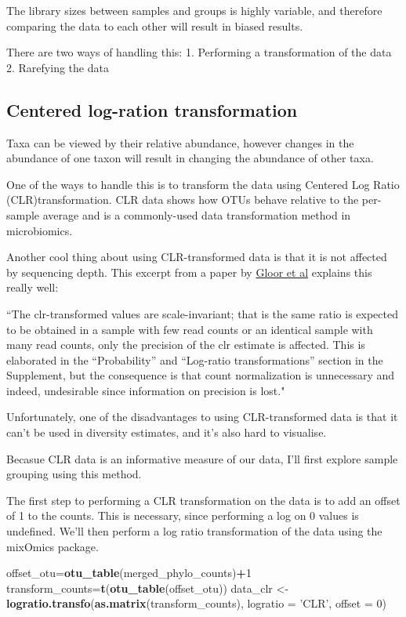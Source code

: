 \documentclass[]{article}
\newenvironment{Shaded}{\begin{snugshade}}{\end{snugshade}}
\newcommand{\DataTypeTok}[1]{\textcolor[rgb]{0.13,0.29,0.53}{#1}}
\newcommand{\DecValTok}[1]{\textcolor[rgb]{0.00,0.00,0.81}{#1}}
\newcommand{\KeywordTok}[1]{\textcolor[rgb]{0.13,0.29,0.53}{\textbf{#1}}}
\newcommand{\NormalTok}[1]{#1}
\newcommand{\OperatorTok}[1]{\textcolor[rgb]{0.81,0.36,0.00}{\textbf{#1}}}
\newcommand{\StringTok}[1]{\textcolor[rgb]{0.31,0.60,0.02}{#1}}
\begin{document}
The library sizes between samples and groups is highly variable, and
therefore comparing the data to each other will result in biased
results.

There are two ways of handling this: 1. Performing a transformation of
the data 2. Rarefying the data

\hypertarget{centered-log-ration-transformation}{%
\subsection{Centered log-ration
transformation}\label{centered-log-ration-transformation}}

Taxa can be viewed by their relative abundance, however changes in the
abundance of one taxon will result in changing the abundance of other
taxa.

One of the ways to handle this is to transform the data using Centered
Log Ratio (CLR)transformation. CLR data shows how OTUs behave relative
to the per-sample average and is a commonly-used data transformation
method in microbiomics.

Another cool thing about using CLR-transformed data is that it is not
affected by sequencing depth. This excerpt from a paper by
\href{https://www.ncbi.nlm.nih.gov/pmc/articles/PMC5695134/}{Gloor et
al} explains this really well:

``The clr-transformed values are scale-invariant; that is the same ratio
is expected to be obtained in a sample with few read counts or an
identical sample with many read counts, only the precision of the clr
estimate is affected. This is elaborated in the ``Probability'' and
``Log-ratio transformations'' section in the Supplement, but the
consequence is that count normalization is unnecessary and indeed,
undesirable since information on precision is lost."

Unfortunately, one of the disadvantages to using CLR-transformed data is
that it can't be used in diversity estimates, and it's also hard to
visualise.

Becasue CLR data is an informative measure of our data, I'll first
explore sample grouping using this method.

The first step to performing a CLR transformation on the data is to add
an offset of 1 to the counts. This is necessary, since performing a log
on 0 values is undefined. We'll then perform a log ratio transformation
of the data using the mixOmics package.

\begin{Shaded}
\begin{Highlighting}[]
\NormalTok{offset_otu=}\KeywordTok{otu_table}\NormalTok{(merged_phylo_counts)}\OperatorTok{+}\DecValTok{1}
\NormalTok{transform_counts=}\KeywordTok{t}\NormalTok{(}\KeywordTok{otu_table}\NormalTok{(offset_otu))}
\NormalTok{data_clr <-}\StringTok{ }\KeywordTok{logratio.transfo}\NormalTok{(}\KeywordTok{as.matrix}\NormalTok{(transform_counts), }\DataTypeTok{logratio =} \StringTok{'CLR'}\NormalTok{, }\DataTypeTok{offset =} \DecValTok{0}\NormalTok{) }
\end{Highlighting}
\end{Shaded}
\end{document}
